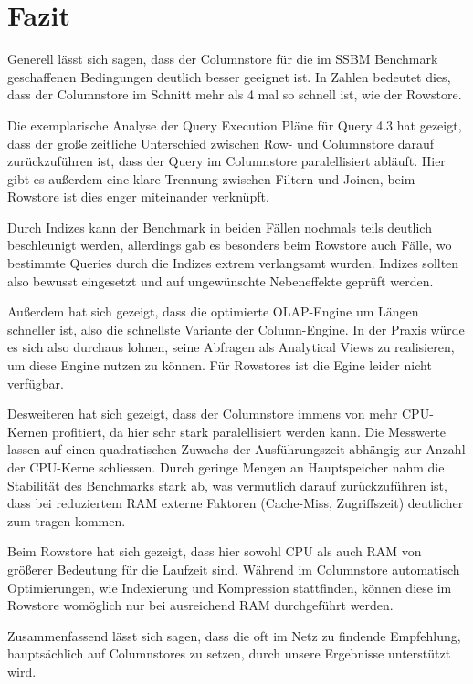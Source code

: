 \chapter{Fazit}
Generell lässt sich sagen, dass der Columnstore für die im SSBM Benchmark geschaffenen Bedingungen deutlich besser geeignet ist.
 In Zahlen bedeutet dies, dass der Columnstore im Schnitt mehr als 4 mal so schnell ist, wie der Rowstore.

Die exemplarische Analyse der Query Execution Pläne für Query 4.3 hat gezeigt, dass der große zeitliche Unterschied zwischen Row- und 
Columnstore darauf zurückzuführen ist, dass der Query im Columnstore paralellisiert abläuft.
Hier gibt es außerdem eine klare Trennung zwischen Filtern und Joinen, beim Rowstore ist dies enger miteinander verknüpft. 


Durch Indizes kann der Benchmark in beiden Fällen nochmals teils deutlich beschleunigt werden, allerdings gab es besonders beim Rowstore auch Fälle, 
wo bestimmte Queries durch die Indizes extrem verlangsamt wurden. Indizes sollten also bewusst eingesetzt und auf ungewünschte Nebeneffekte geprüft werden.

Außerdem hat sich gezeigt, dass die optimierte OLAP-Engine um Längen schneller ist, also die schnellste Variante der Column-Engine. In der Praxis
würde es sich also durchaus lohnen, seine Abfragen als Analytical Views zu realisieren, um diese Engine nutzen zu können. Für Rowstores ist die Egine leider nicht verfügbar.

Desweiteren hat sich gezeigt, dass der Columnstore immens von mehr CPU-Kernen profitiert, da hier sehr stark paralellisiert werden kann. 
Die Messwerte lassen auf einen quadratischen Zuwachs der Ausführungszeit abhängig zur Anzahl der CPU-Kerne schliessen. Durch geringe Mengen an 
Hauptspeicher nahm die Stabilität des Benchmarks stark ab, was vermutlich darauf zurückzuführen ist, dass bei reduziertem RAM externe Faktoren (Cache-Miss, Zugriffszeit) deutlicher zum tragen kommen. 

Beim Rowstore hat sich gezeigt, dass hier sowohl CPU als auch RAM von größerer Bedeutung für die Laufzeit sind. 
Während im Columnstore automatisch Optimierungen, wie Indexierung und Kompression stattfinden, können diese im Rowstore womöglich nur bei ausreichend RAM durchgeführt werden. 

Zusammenfassend lässt sich sagen, dass die oft im Netz zu findende Empfehlung, hauptsächlich auf Columnstores zu setzen, durch unsere Ergebnisse unterstützt wird.

